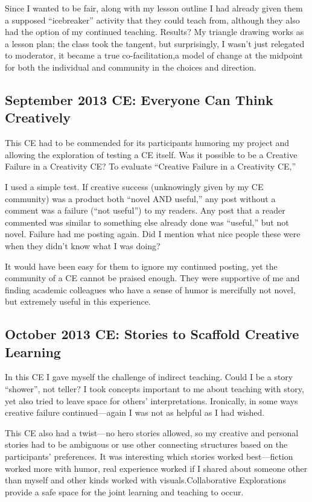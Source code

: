 Since I wanted to be fair, along with my lesson outline I had
already given them a supposed ``icebreaker'' activity that they could
teach from, although they also had the option of my continued teaching.
Results? My triangle drawing works as a lesson plan; the class took the
tangent, but surprisingly, I wasn't just relegated to moderator, it
became a true co-facilitation,a model of change at the midpoint for both
the individual and community in the choices and direction.

\subsection{September 2013 CE: Everyone Can Think Creatively}

This CE had to be commended for its participants humoring my project and
allowing the exploration of testing a CE itself. Was it possible to be a
Creative Failure in a Creativity CE? To evaluate ``Creative Failure in a
Creativity CE,''

I used a simple test. If creative success (unknowingly given by my CE
community) was a product both ``novel AND useful,'' any post without a
comment was a failure (``not useful'') to my readers. Any post that a
reader commented was similar to something else already done was
``useful,'' but not novel. Failure had me posting again. Did I mention
what nice people these were when they didn't know what I was doing?

It would have been easy for them to ignore my continued posting,
yet the community of a CE cannot be praised enough. They were supportive
of me and finding academic colleagues who have a sense of humor is
mercifully not novel, but extremely useful in this experience.

\subsection{October 2013 CE: Stories to Scaffold Creative Learning}

In this CE I gave myself the challenge of indirect teaching. Could I be
a story ``shower'', not teller? I took concepts important to me about
teaching with story, yet also tried to leave space for others'
interpretations. Ironically, in some ways creative failure
continued---again I was not as helpful as I had wished. 

This CE also had
a twist---no hero stories allowed, so my creative and personal stories
had to be ambiguous or use other connecting structures based on the
participants' preferences. It was interesting which stories worked
best---fiction worked more with humor, real experience worked if I
shared about someone other than myself and other kinds worked with
visuals.Collaborative Explorations provide a safe space for the joint
learning and teaching to occur. 

